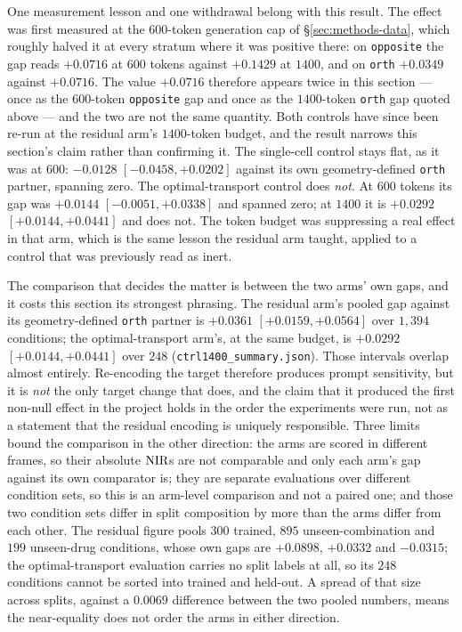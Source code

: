 One measurement lesson and one withdrawal belong with this result. The effect was first measured at
the $600$-token generation cap of \S\ref{sec:methods-data}, which roughly halved it at every
stratum where it was positive there: on \texttt{opposite} the gap reads $+0.0716$ at $600$ tokens
against $+0.1429$ at $1400$, and on \texttt{orth} $+0.0349$ against $+0.0716$. The value $+0.0716$
therefore appears twice in this section --- once as the $600$-token \texttt{opposite} gap and once
as the $1400$-token \texttt{orth} gap quoted above --- and the two are not the same quantity.
Both controls have since been re-run at the residual arm's $1400$-token
budget, and the result narrows this section's claim rather than confirming it. The single-cell
control stays flat, as it was at $600$: $-0.0128$ \nolinebreak[3]$[-0.0458, +0.0202]$ against its
own geometry-defined \texttt{orth} partner, spanning zero. The optimal-transport control does \emph{not}. At $600$
tokens its gap was $+0.0144$ \nolinebreak[3]$[-0.0051, +0.0338]$ and spanned zero; at $1400$ it is
$+0.0292$ \nolinebreak[3]$[+0.0144, +0.0441]$ and does not. The token budget was suppressing a real
effect in that arm, which is the same lesson the residual arm taught, applied to a control that was
previously read as inert.

The comparison that decides the matter is between the two arms' own gaps, and it costs this section
its strongest phrasing. The residual arm's pooled gap against its geometry-defined \texttt{orth}
partner is
$+0.0361$ \nolinebreak[3]$[+0.0159, +0.0564]$ over $1{,}394$ conditions; the optimal-transport arm's,
at the same budget, is $+0.0292$ \nolinebreak[3]$[+0.0144, +0.0441]$ over $248$
(\texttt{ctrl1400\_summary.json}). Those intervals overlap almost entirely. Re-encoding
the target therefore produces prompt sensitivity, but it is \emph{not} the only target change that
does, and the claim that it produced the first non-null effect in the project holds in the
order the experiments were run, not as a statement that the residual encoding is uniquely
responsible. Three limits bound the comparison in the other direction: the arms are scored in
different frames, so their absolute $\textrm{NIR}$s are not comparable and only each arm's gap against its
own comparator is; they are separate evaluations over different condition sets, so this is an
arm-level comparison and not a paired one; and those two condition sets differ in split composition
by more than the arms differ from each other. The residual figure pools $300$ trained, $895$
unseen-combination and $199$ unseen-drug conditions, whose own gaps are $+0.0898$, $+0.0332$ and
$-0.0315$; the optimal-transport evaluation carries no split labels at all, so its $248$ conditions
cannot be sorted into trained and held-out. A spread of that size across splits, against a $0.0069$
difference between the two pooled numbers, means the near-equality does not order the arms in
either direction.

